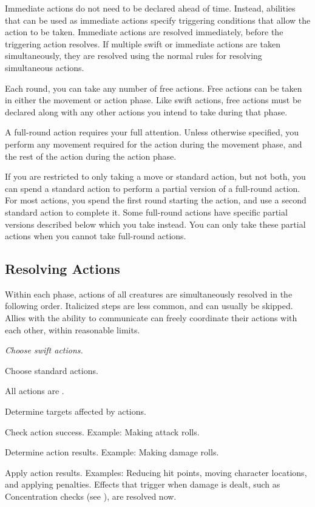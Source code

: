         Immediate actions do not need to be declared ahead of time.
        Instead, abilities that can be used as immediate actions specify triggering conditions that allow the action to be taken.
        Immediate actions are resolved immediately, before the triggering action resolves.
        If multiple swift or immediate actions are taken simultaneously, they are resolved using the normal rules for resolving simultaneous actions.

        \label{Free Actions} Each round, you can take any number of free actions.
        Free actions can be taken in either the movement or action phase.
        Like swift actions, free actions must be declared along with any other actions you intend to take during that phase.

         A full-round action requires your full attention.
        Unless otherwise specified, you perform any movement required for the action during the movement phase, and the rest of the action during the action phase.

         If you are restricted to only taking a move or standard action, but not both, you can spend a standard action to perform a partial version of a full-round action. For most actions, you spend the first round starting the action, and use a second standard action to complete it. Some full-round actions have specific partial versions described below which you take instead. You can only take these partial actions when you cannot take full-round actions.

    \subsection{Resolving Actions}\label{Resolving Actions}

        Within each phase, actions of all creatures are simultaneously resolved in the following order.
        Italicized steps are less common, and can usually be skipped.
        Allies with the ability to communicate can freely coordinate their actions with each other, within reasonable limits.

        \begin{enumerate*}
            \item \textit{Choose swift actions.}
            \item Choose standard actions.
            \item All actions are .
            \item Determine targets affected by actions.
            \item Check action success.
                Example: Making attack rolls.
            \item Determine action results.
                Example: Making damage rolls.
            \item Apply action results.
                Examples: Reducing hit points, moving character locations, and applying penalties.
                Effects that trigger when damage is dealt, such as Concentration checks (see ), are resolved now.
        \end{enumerate*}

